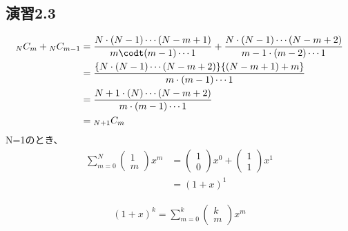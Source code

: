 \documentclass{bxjsarticle}
\begin{document}
\subsection*{演習2.3}
\begin{align*}
{}_N C_m+{}_N C_{m-1} &= \frac{N \cdot (N-1) \cdots (N-m+1)}{m \codt (m-1) \cdots 1} + \frac{N \cdot (N-1) \cdots (N-m+2)}{m-1 \cdot (m-2) \cdots 1} \\
                      &=\frac{\{N \cdot (N-1) \cdots (N-m+2)\}\{(N-m+1)+m\}}{m \cdot (m-1) \cdots 1} \\
                      &=\frac{N+1 \cdot (N) \cdots (N-m+2)}{m \cdot (m-1) \cdots 1} \\
                      &={}_{N+1} C_m
\end{align*}
N=1のとき、
\begin{align*}
\sum_{m=0}^N{\left(\begin{array}{ll} 1 \\ m \end{array} \right)x^m} &= \left(\begin{array}{ll} 1 \\ 0 \end{array} \right)x^0+\left(\begin{array}{ll} 1 \\ 1 \end{array} \right)x^1 \\
        &= (1+x)^1
\end{align*}

\begin{align*}
(1+x)^k = \sum_{m=0}^k{\left(\begin{array}{ll} k \\ m \end{array} \right)x^m}
\end{align*}
\end{document}
